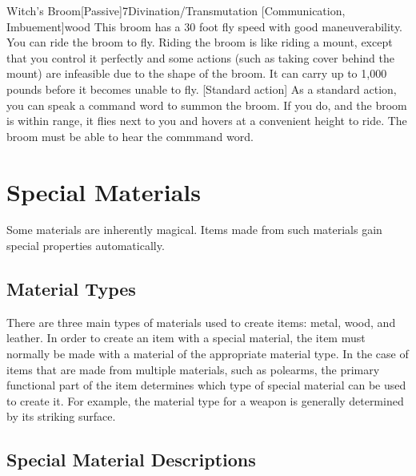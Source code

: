         \begin{magicitemdef}{Witch's Broom}[Passive]{7}{Divination/Transmutation [Communication, Imbuement]}{wood}
             This broom has a 30 foot fly speed with good maneuverability.
            You can ride the broom to fly.
            Riding the broom is like riding a mount, except that you control it perfectly and some actions (such as taking cover behind the mount) are infeasible due to the shape of the broom.
            It can carry up to 1,000 pounds before it becomes unable to fly.
            [Standard action] As a standard action, you can speak a command word to summon the broom.
            If you do, and the broom is within \rngext range, it flies next to you and hovers at a convenient height to ride.
            The broom must be able to hear the commmand word.
        \end{magicitemdef}

\section{Special Materials}

    Some materials are inherently magical.
    Items made from such materials gain special properties automatically.

    \subsection{Material Types}
        There are three main types of materials used to create items: metal, wood, and leather.
        In order to create an item with a special material, the item must normally be made with a material of the appropriate material type.
        In the case of items that are made from multiple materials, such as polearms, the primary functional part of the item determines which type of special material can be used to create it.
        For example, the material type for a weapon is generally determined by its striking surface.

    \subsection{Special Material Descriptions}

